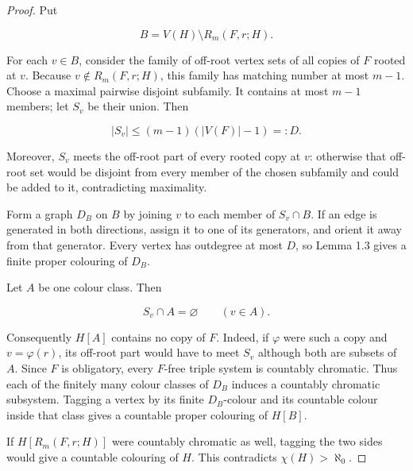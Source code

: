 \documentclass[a4paper,11pt,reqno]{amsart}
\theoremstyle{plain}
\theoremstyle{definition}
\theoremstyle{remark}
\begin{document}
\begin{proof}
Put

\[
B=V(H)\setminus R_m(F,r;H).
\]

For each \(v\in B\), consider the family of off-root vertex sets of all
copies of \(F\) rooted at \(v\). Because
\(v\notin R_m(F,r;H)\), this family has matching number at most \(m-1\).
Choose a maximal pairwise disjoint subfamily. It contains at most \(m-1\)
members; let \(S_v\) be their union. Then

\[
|S_v|\le(m-1)(|V(F)|-1)=:D.
\]

Moreover, \(S_v\) meets the off-root part of every rooted copy at \(v\):
otherwise that off-root set would be disjoint from every member of the
chosen subfamily and could be added to it, contradicting maximality.

Form a graph \(D_B\) on \(B\) by joining \(v\) to each member of \(S_v\cap B\). If an edge is generated in both directions, assign it to one of its generators, and orient it away from that generator. Every vertex has outdegree at most \(D\), so Lemma 1.3 gives a finite proper colouring of \(D_B\).

Let \(A\) be one colour class. Then

\[
S_v\cap A=\varnothing\qquad(v\in A).
\]

Consequently \(H[A]\) contains no copy of \(F\). Indeed, if \(\varphi\) were such a copy and \(v=\varphi(r)\), its off-root part would have to meet \(S_v\) although both are subsets of \(A\). Since \(F\) is obligatory, every \(F\)-free triple system is countably chromatic. Thus each of the finitely many colour classes of \(D_B\) induces a countably chromatic subsystem. Tagging a vertex by its finite \(D_B\)-colour and its countable colour inside that class gives a countable proper colouring of \(H[B]\).

If \(H[R_m(F,r;H)]\) were countably chromatic as well, tagging the two sides would give a countable colouring of \(H\). This contradicts \(\chi(H)>\aleph_0\).
\end{proof}
\end{document}
